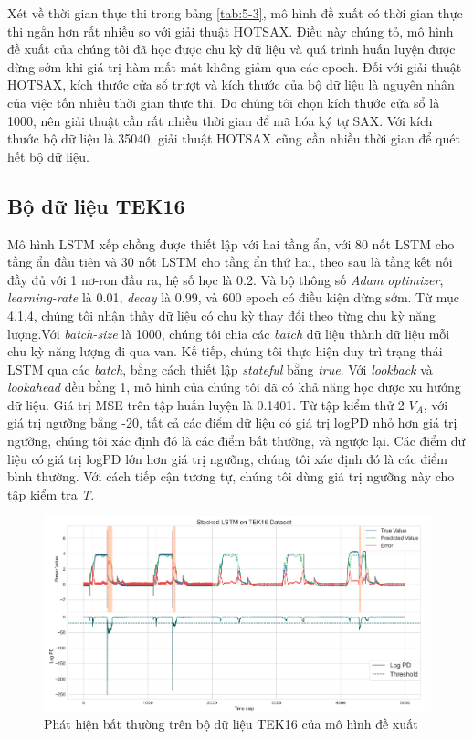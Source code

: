 Xét về thời gian thực thi trong bảng \ref{tab:5-3}, mô hình đề xuất có thời gian thực thi ngắn hơn rất nhiều so với giải thuật HOTSAX. Điều này chúng tỏ, mô hình đề xuất của chúng tôi đã học được chu kỳ dữ liệu và quá trình huấn luyện được dừng sớm khi giá trị hàm mất mát không giảm qua các epoch. Đối với giải thuật HOTSAX, kích thước cửa sổ trượt và kích thước của bộ dữ liệu là nguyên nhân của việc tốn nhiều thời gian thực thi. Do chúng tôi chọn kích thước cửa sổ là 1000, nên giải thuật cần rất nhiều thời gian để mã hóa ký tự SAX. Với kích thước bộ dữ liệu là 35040, giải thuật HOTSAX cũng cần nhiều thời gian để quét hết bộ dữ liệu.

\subsection{Bộ dữ liệu TEK16}
Mô hình LSTM xếp chồng được thiết lập với hai tầng ẩn, với 80 nốt LSTM cho tầng ẩn đầu tiên và 30 nốt LSTM cho tầng ẩn thứ hai, theo sau là tầng kết nối đầy đủ với 1 nơ-ron đầu ra, hệ số học là 0.2. Và bộ thông số \textit{Adam optimizer}, \textit{learning-rate} là 0.01, \textit{decay} là 0.99, và 600 epoch có điều kiện dừng sớm. Từ mục 4.1.4, chúng tôi nhận thấy dữ liệu có chu kỳ thay đổi theo từng chu kỳ năng lượng.Với \textit{batch-size} là 1000, chúng tôi chia các \textit{batch} dữ liệu thành dữ liệu mỗi chu kỳ năng lượng đi qua van. Kế tiếp, chúng tôi thực hiện duy trì trạng thái LSTM qua các \textit{batch}, bằng cách thiết lập \textit{stateful} bằng \textit{true}. Với \textit{lookback} và \textit{lookahead} đều bằng 1, mô hình của chúng tôi đã có khả năng học được xu hướng dữ liệu. Giá trị MSE trên tập huấn luyện là 0.1401. Từ tập kiểm thử 2 $V_{A}$, với giá trị ngưỡng bằng -20, tất cả các điểm dữ liệu có giá trị logPD nhỏ hơn giá trị ngưỡng, chúng tôi xác định đó là các điểm bất thường, và ngược lại. Các điểm dữ liệu có giá trị logPD lớn hơn giá trị ngưỡng, chúng tôi xác định đó là các điểm bình thường. Với cách tiếp cận tương tự, chúng tôi dùng giá trị ngưỡng này cho tập kiểm tra \textit{T}.

\begin{figure}[H]
    \centering
    \includegraphics[scale=1]{./content/images/5-9.png}
    \caption{Phát hiện bất thường trên bộ dữ liệu TEK16 của mô hình đề xuất}
    \label{fig:5-9}
\end{figure}

